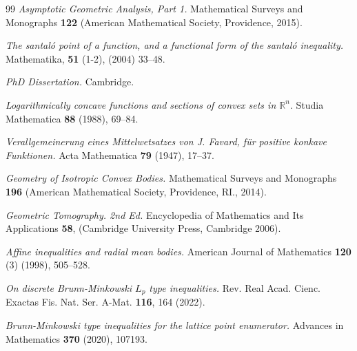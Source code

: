 \documentclass{amsart}
\newcommand{\R}{\mathbb R}
\theoremstyle{remark}
\theoremstyle{definition}
\numberwithin{equation}{section}
\begin{document}
\begin{thebibliography}{99}
\textit{Asymptotic Geometric Analysis, Part 1.}
Mathematical Surveys and Monographs {\bf 122} (American Mathematical Society, Providence, 2015).

\textit{The santal\'o point of a function, and a functional form of the santal\'o inequality.}
Mathematika, {\bf 51} (1-2), (2004) 33--48.


\textit{PhD Dissertation.} Cambridge.

\textit{Logarithmically concave functions and sections of convex sets in $\R^n$}.
Studia Mathematica {\bf 88} (1988),  69--84.

\textit{Verallgemeinerung eines Mittelwetsatzes von J. Favard, f\"ur positive konkave Funktionen.}
Acta Mathematica {\bf 79}  (1947), 17--37.

 \textit{Geometry of Isotropic Convex Bodies.}
Mathematical Surveys and Monographs {\bf 196} (American Mathematical Society, Providence, RI., 2014).



\textit{Geometric Tomography. 2nd Ed.}
Encyclopedia of Mathematics and Its Applications {\bf 58}, (Cambridge University Press, Cambridge 2006).

\textit{Affine inequalities and radial mean bodies.}
American Journal of Mathematics {\bf 120} (3) (1998), 505--528.

\textit{On discrete  Brunn-Minkowski $L_p$ type inequalities.}
Rev. Real Acad. Cienc. Exactas Fis. Nat. Ser. A-Mat. {\bf 116}, 164 (2022).

\textit{Brunn-Minkowski type
inequalities for the lattice point enumerator.}
Advances in Mathematics {\bf 370} (2020), 107193.


\end{thebibliography}
\end{document}
